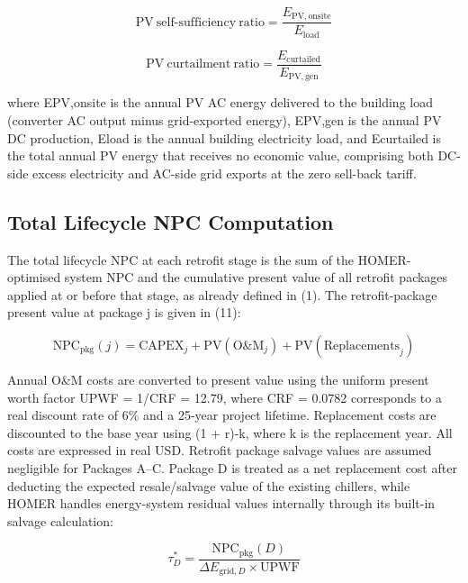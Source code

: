 \documentclass[journal,fleqn]{IEEEtran}
\begin{document}
\begin{equation}\label{eq:self-sufficiency}\mathrm{PV\ self\mbox{-}sufficiency\ ratio}=\frac{E_{\mathrm{PV,onsite}}}{E_{\mathrm{load}}}\end{equation}

\begin{equation}\label{eq:curtailment}\mathrm{PV\ curtailment\ ratio}=\frac{E_{\mathrm{curtailed}}}{E_{\mathrm{PV,gen}}}\end{equation}

where EPV,onsite is the annual PV AC energy delivered to the building load (converter AC output minus grid-exported energy), EPV,gen is the annual PV DC production, Eload is the annual building electricity load, and Ecurtailed is the total annual PV energy that receives no economic value, comprising both DC-side excess electricity and AC-side grid exports at the zero sell-back tariff.


\subsection{Total Lifecycle NPC Computation}

The total lifecycle NPC at each retrofit stage is the sum of the HOMER-optimised system NPC and the cumulative present value of all retrofit packages applied at or before that stage, as already defined in (1). The retrofit-package present value at package j is given in (11):


\begin{equation}\label{eq:npc-pkg}\mathrm{NPC}_{\mathrm{pkg}}(j)=\mathrm{CAPEX}_{j}+\mathrm{PV}(\mathrm{O\&M}_{j})+\mathrm{PV}(\mathrm{Replacements}_{j})\end{equation}

Annual O\&M costs are converted to present value using the uniform present worth factor UPWF = 1/CRF = 12.79, where CRF = 0.0782 corresponds to a real discount rate of 6\% and a 25-year project lifetime. Replacement costs are discounted to the base year using (1 + r)-k, where k is the replacement year. All costs are expressed in real USD. Retrofit package salvage values are assumed negligible for Packages A--C. Package D is treated as a net replacement cost after deducting the expected resale/salvage value of the existing chillers, while HOMER handles energy-system residual values internally through its built-in salvage calculation:


\begin{equation}\label{eq:tau-d}\tau^{*}_{D}=\frac{\mathrm{NPC}_{\mathrm{pkg}}(D)}{\Delta E_{\mathrm{grid},D}\times \mathrm{UPWF}}\end{equation}
\end{document}
